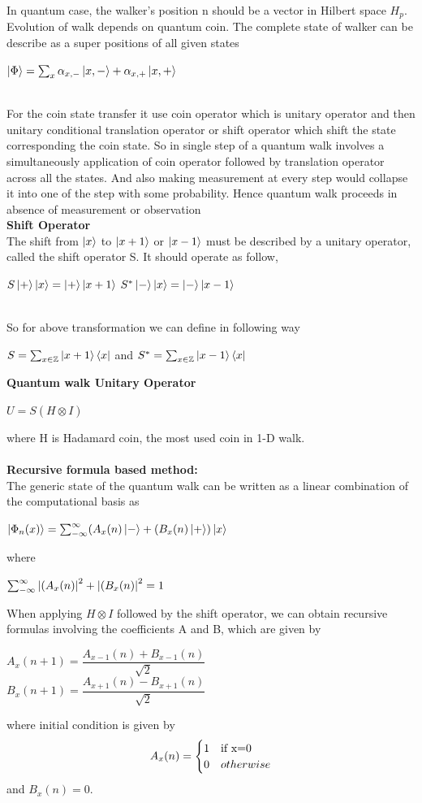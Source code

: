 \documentclass[11 pt]{article}
\theoremstyle{definition}
\theoremstyle{remark}
\newcommand{\tens}[1]{
  \mathbin{\mathop{\otimes}\limits_{#1}}}
\begin{document}
In quantum case, the walker's position n should be a vector in Hilbert space $H_{p}$. Evolution of walk depends on quantum coin. The complete state of walker can be describe as a super positions of all given states
\begin{center}
    $\ket{\Phi} = \sum_{x} \alpha_{x,-}\ket{x,-} + \alpha_{x,+}\ket{x,+}$
\end{center}
\\
For the coin state transfer it use coin operator which is unitary operator and then unitary conditional translation operator or shift operator which shift the state corresponding the coin state. So in single step of a quantum walk involves a simultaneously application of coin operator followed by translation operator across all the states. And also making measurement at every step would collapse it into one of the step with some probability. Hence quantum walk proceeds in absence of measurement or observation\\
\textbf{Shift Operator}\\
The shift from $\ket{x}$ to $\ket{x+1}$ or $\ket{x-1}$ must be described by a unitary operator, called the shift operator S. It should operate as follow,
\begin{center}
    $ S \ket{+}\ket{x} = \ket{+} \ket{x+1}$
    $ S^* \ket{-}\ket{x} = \ket{-} \ket{x-1}$
\end{center}\\
So for above transformation we can define in following way
\begin{center}
    $S = \sum_{x \in \mathbb{Z}} \ket{x+1}\bra{x}$ and 
    $S^* = \sum_{x \in \mathbb{Z}} \ket{x-1}\bra{x}$
\end{center}
\textbf{Quantum walk Unitary Operator}
\begin{center}
    $U = S ( H \tens{} I)$
\end{center}
where H is Hadamard coin, the most used coin in 1-D walk.\\
\\
\textbf{Recursive formula based method:}\\
The generic state of the quantum walk can be written as a linear combination of the computational basis as
\begin{center}
    $\ket{\Phi_n(x)} = \sum_{-\infty}^{\infty} (A_{x}(n)\ket{-} +(B_{x}(n)\ket{+}) \ket{x}$
\end{center}
where 
\begin{center}
    $ \sum_{-\infty}^{\infty} \abs{(A_{x}(n)}^2 + \abs{(B_{x}(n)}^2 = 1$
\end{center}
When applying $H \tens{} I $ followed by the shift operator, we can obtain recursive formulas involving the coefficients A and B, which are given by
\begin{center}
    $A_{x}(n+1) = \dfrac{A_{x-1}(n) + B_{x-1}(n)}{\sqrt{2}}$\\
    $B_{x}(n+1) = \dfrac{A_{x+1}(n) - B_{x+1}(n)}{\sqrt{2}}$
\end{center}
where initial condition is given by
\[ 
A_{x}(n)=     \begin{cases} 
                    1 & $if x=0$\\
                    0 & otherwise
                \end{cases}
\]
and $B_{x}(n)=0$.
\end{document}
